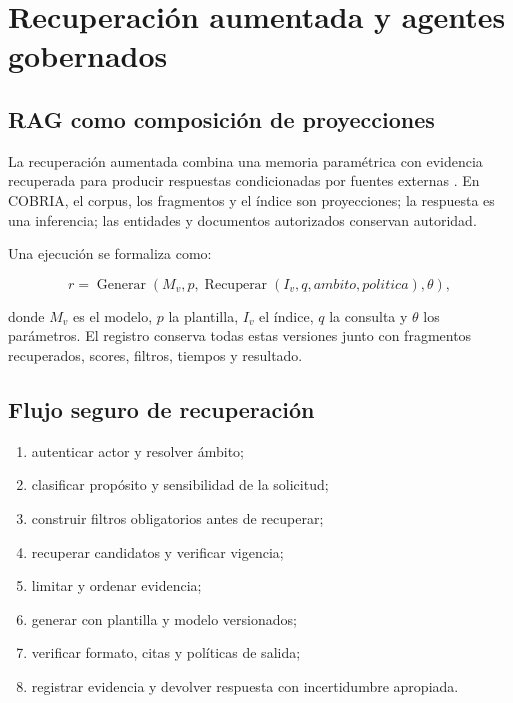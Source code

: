 \chapter{Recuperación aumentada y agentes gobernados}

\section{RAG como composición de proyecciones}

La recuperación aumentada combina una memoria paramétrica con evidencia recuperada para
producir respuestas condicionadas por fuentes externas \parencite{lewis2020rag}. En
COBRIA, el corpus, los fragmentos y el índice son proyecciones; la respuesta es una
inferencia; las entidades y documentos autorizados conservan autoridad.

Una ejecución se formaliza como:

\begin{equation}
r=\operatorname{Generar}(M_v,p,\operatorname{Recuperar}(I_v,q,ambito,politica),\theta),
\end{equation}

donde $M_v$ es el modelo, $p$ la plantilla, $I_v$ el índice, $q$ la consulta y $\theta$
los parámetros. El registro conserva todas estas versiones junto con fragmentos
recuperados, scores, filtros, tiempos y resultado.

\section{Flujo seguro de recuperación}

\begin{enumerate}[leftmargin=*]
  \item autenticar actor y resolver ámbito;
  \item clasificar propósito y sensibilidad de la solicitud;
  \item construir filtros obligatorios antes de recuperar;
  \item recuperar candidatos y verificar vigencia;
  \item limitar y ordenar evidencia;
  \item generar con plantilla y modelo versionados;
  \item verificar formato, citas y políticas de salida;
  \item registrar evidencia y devolver respuesta con incertidumbre apropiada.
\end{enumerate}

